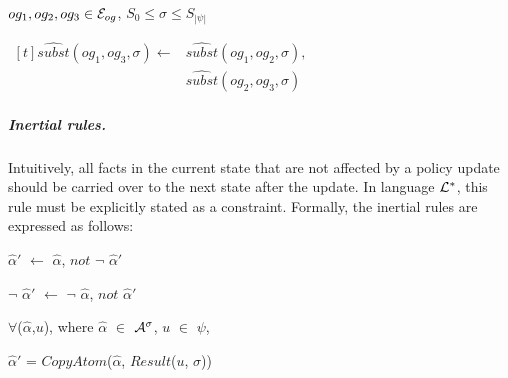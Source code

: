 \documentclass[11pt, twocolumn]{article}
\newenvironment{vquote}
  {\begin{list}{}{\leftmargin 1em}\item[]}
  {\end{list}}
\begin{document}
\begin{enumerate}
                $og_{1}, og_{2}, og_{3} \in {\cal E}_{og}$,
                $S_{0} \leq \sigma \leq S_{|\psi|}$

                \begin{math}
                  \begin{aligned}[t]
                    \hat{subst}(og_{1}, og_{3}, \sigma) \leftarrow &
                    \hat{subst}(og_{1}, og_{2}, \sigma), \\
                    & \hat{subst}(og_{2}, og_{3}, \sigma)
                  \end{aligned}
                \end{math}
            \end{enumerate}

          \subparagraph{Inertial rules.}

            Intuitively, all facts in the current state that are not affected
            by a policy update should be carried over to the next state after
            the update. In language ${\cal L}^{*}$, this rule must be
            explicitly stated as a constraint. Formally, the inertial rules
            are expressed as follows:

            \begin{vquote}
              $\hat{\alpha}'$ $\leftarrow$ $\hat{\alpha}$, $not$ $\lnot$ $\hat{\alpha}'$

              $\lnot$ $\hat{\alpha}'$ $\leftarrow$ $\lnot$ $\hat{\alpha}$, $not$ $\hat{\alpha}'$

              $\forall$($\hat{\alpha}$,$u$), where
              $\hat{\alpha}$ $\in$ ${\cal A}^{\sigma}$,
              $u$ $\in$ $\psi$,

              $\hat{\alpha}'$ = $CopyAtom$($\hat{\alpha}$, $Result$($u$, $\sigma$))
            \end{vquote}
\end{document}
